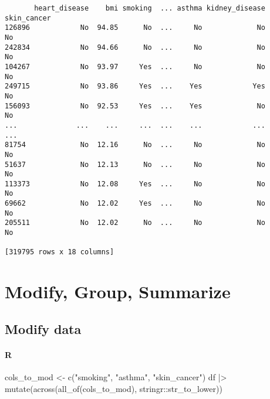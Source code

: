 \documentclass[
  letterpaper,
  DIV=11,
  numbers=noendperiod]{scrreprt}
\newenvironment{Shaded}{\begin{snugshade}}{\end{snugshade}}
\newcommand{\FunctionTok}[1]{\textcolor[rgb]{0.28,0.35,0.67}{#1}}
\newcommand{\NormalTok}[1]{\textcolor[rgb]{0.00,0.46,0.62}{#1}}
\newcommand{\OtherTok}[1]{\textcolor[rgb]{0.00,0.46,0.62}{#1}}
\newcommand{\SpecialCharTok}[1]{\textcolor[rgb]{0.37,0.37,0.37}{#1}}
\newcommand{\StringTok}[1]{\textcolor[rgb]{0.13,0.47,0.30}{#1}}
\begin{document}
\begin{verbatim}
       heart_disease    bmi smoking  ... asthma kidney_disease  skin_cancer
126896            No  94.85      No  ...     No             No           No
242834            No  94.66      No  ...     No             No           No
104267            No  93.97     Yes  ...     No             No           No
249715            No  93.86     Yes  ...    Yes            Yes           No
156093            No  92.53     Yes  ...    Yes             No           No
...              ...    ...     ...  ...    ...            ...          ...
81754             No  12.16      No  ...     No             No           No
51637             No  12.13      No  ...     No             No           No
113373            No  12.08     Yes  ...     No             No           No
69662             No  12.02     Yes  ...     No             No           No
205511            No  12.02      No  ...     No             No           No

[319795 rows x 18 columns]
\end{verbatim}

\hypertarget{modify-group-summarize}{%
\chapter{Modify, Group, Summarize}\label{modify-group-summarize}}

\hypertarget{modify-data}{%
\section{Modify data}\label{modify-data}}

\hypertarget{r-25}{%
\subsubsection{R}\label{r-25}}

\begin{Shaded}
\begin{Highlighting}[]
\NormalTok{cols\_to\_mod }\OtherTok{\textless{}{-}} \FunctionTok{c}\NormalTok{(}\StringTok{"smoking"}\NormalTok{, }\StringTok{"asthma"}\NormalTok{, }\StringTok{"skin\_cancer"}\NormalTok{)}
\NormalTok{df }\SpecialCharTok{|\textgreater{}} \FunctionTok{mutate}\NormalTok{(}\FunctionTok{across}\NormalTok{(}\FunctionTok{all\_of}\NormalTok{(cols\_to\_mod), stringr}\SpecialCharTok{::}\NormalTok{str\_to\_lower))}
\end{Highlighting}
\end{Shaded}
\end{document}
